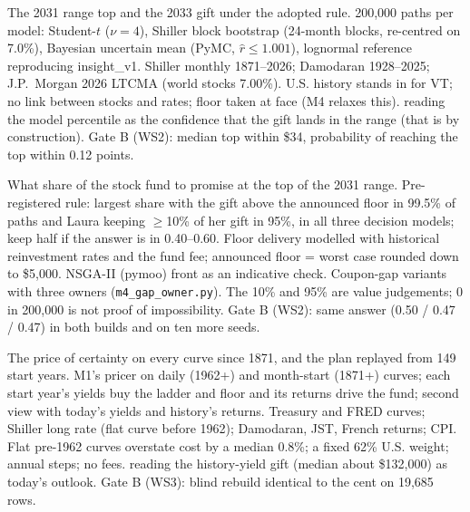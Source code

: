  The 2031 range top and the 2033 gift under the adopted rule.
 200,000 paths per model: Student-$t$ ($\nu=4$), Shiller block bootstrap (24-month blocks, re-centred on
7.0\%), Bayesian uncertain mean (PyMC, $\hat r\le1.001$), lognormal reference reproducing insight\_v1.
 Shiller monthly 1871--2026; Damodaran 1928--2025; J.P.~Morgan 2026 LTCMA (world stocks 7.00\%).
 U.S. history stands in for VT; no link between stocks and rates; floor taken at face (M4 relaxes this).
 reading the model percentile as the confidence that the gift lands in the range (that is by construction).
 Gate B (WS2): median top within \$34, probability of reaching the top within 0.12 points.

 What share of the stock fund to promise at the top of the 2031 range.
 Pre-registered rule: largest share with the gift above the announced floor in 99.5\% of paths and Laura
keeping $\ge$10\% of her gift in 95\%, in all three decision models; keep half if the answer is in 0.40--0.60. Floor
delivery modelled with historical reinvestment rates and the fund fee; announced floor = worst case rounded down to
\$5,000. NSGA-II (pymoo) front as an indicative check. Coupon-gap variants with three owners (\texttt{m4\_gap\_owner.py}).
 The 10\% and 95\% are value judgements; 0 in 200,000 is not proof of impossibility.
 Gate B (WS2): same answer (0.50 / 0.47 / 0.47) in both builds and on ten more seeds.

 The price of certainty on every curve since 1871, and the plan replayed from 149 start years.
 M1's pricer on daily (1962+) and month-start (1871+) curves; each start year's yields buy the ladder and
floor and its returns drive the fund; second view with today's yields and history's returns.
 Treasury and FRED curves; Shiller long rate (flat curve before 1962); Damodaran, JST, French returns; CPI.
 Flat pre-1962 curves overstate cost by a median 0.8\%; a fixed 62\% U.S. weight; annual steps; no fees.
 reading the history-yield gift (median about \$132,000) as today's outlook.
 Gate B (WS3): blind rebuild identical to the cent on 19,685 rows.

